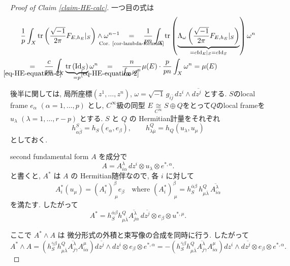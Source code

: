 \documentclass[dvipdfmx,a4paper,11pt]{article} %
\theoremstyle{definition}
\theoremstyle{remark}
\numberwithin{equation}{section}
\newcommand{\underalign}[2]{\quad \underset{\mathclap{\strut #1}}{#2}\quad}
\begin{document}
\begin{proof}[Proof of Claim \ref{claim-HE-calc}]
一つ目の式は
\begin{align*}
& \frac{1}{p}
\int_{X} 
\mathrm{tr}\left(\frac{\sqrt{-1}}{2 \pi} F_{E, h_E}|_{S}\right)
 \wedge \omega^{n-1}
  \underalign{\text{Cor. \ref{cor-lambda-formula}}}{=}
  \frac{1}{pn}
\int_{X} 
\mathrm{tr}\left(\underbrace{\Lambda_{\omega}\left(\frac{\sqrt{-1}}{2 \pi} F_{E, h_E}|_{S}\right)}_{=c\mathrm{Id}_E|_{S}=c\mathrm{Id}_{S}}\right)
\omega^{n}
\\
  &\underalign{\eqref{eq-HE-equation-2}}{=}
    \frac{c}{pn}
\int_{X} 
\underbrace{\mathrm{tr}\left(\mathrm{Id}_{S}\right)}_{=p}
\omega^{n}
 \underalign{\eqref{eq-HE-equation-2}}{=}
  \frac{n}{\int_{X}\omega^n}\mu(E) \cdot
  \frac{p}{pn}
  \int_{X} 
\omega^{n}
=
 \mu(E)
 \end{align*}
 
 後半に関しては, 局所座標$(z^1,\ldots,z^n)$, $\omega
=
\sqrt{-1}\,g_{i\overline j}\,dz^i\wedge d\overline{z^j}$
とする. 
$S$のlocal frame $e_\alpha$ \((\alpha=1,\ldots,p)\) とし, $C^\infty$級の同型
$E \underset{C^\infty}{\cong}S \oplus Q$をとって$Q$のlocal frameを
 $u_\lambda$ \((\lambda=1,\ldots,r-p)\) とする. 
  \(S\) と \(Q\) の Hermitian計量をそれぞれ
\[
h^S_{\alpha\overline\beta}
=
h_S(e_\alpha,e_\beta),
\qquad
h^Q_{\lambda\overline\mu}
=
h_Q(u_\lambda,u_\mu)
\]
としておく. 
 
second fundamental form \(A\) を成分で
\[
A
=
A^\lambda_{i\alpha}\,
dz^i\otimes u_\lambda\otimes e^{*,\alpha}.
\]
と書くと, 
\(A^*\) は \(A\) の Hermitian随伴なので,
各 \(i\) に対して
\[
A_i^*(u_\mu)
=
(A_i^*)^\beta_{\ \mu}e_\beta
\quad \text{where }
(A_i^*)^\beta_{\ \mu}
=
h_S^{\overline\alpha\beta}\,
h^Q_{\mu\overline\lambda}\,
\overline{A^\lambda_{i\alpha}}
\]
を満たす.
したがって
\[
A^*
=
h_S^{\overline\alpha\beta}
h^Q_{\mu\overline\lambda}
\overline{A^\lambda_{j\alpha}}\,
d\overline{z^j}\otimes e_\beta\otimes u^{*,\mu}.
\]

ここで \(A^*\wedge A\) は
微分形式の外積と束写像の合成を同時に行う.
したがって
\[
A^*\wedge A
=
\left(
h_S^{\overline\gamma\beta}
h^Q_{\mu\overline\lambda}
\overline{A^\lambda_{j\gamma}}
A^\mu_{i\alpha}
\right)
d\overline{z^j}\wedge dz^i
\otimes e_\beta\otimes e^{*,\alpha}
=
-
\left(
h_S^{\overline\gamma\beta}
h^Q_{\mu\overline\lambda}
\overline{A^\lambda_{j\gamma}}
A^\mu_{i\alpha}
\right)
dz^i\wedge d\overline{z^j}
\otimes e_\beta\otimes e^{*,\alpha}.
\]


\end{proof}
\end{document}
